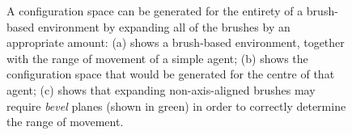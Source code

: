 \documentclass[10pt,twocolumn]{article}
\newenvironment{stusubfig}[1]
{
	\begin{figure}[#1]
	\begin{center}
}
{
	\end{center}
	\end{figure}
}
\begin{document}
\begin{stusubfig}{!t}
	\hspace{4mm}%
	\hspace{4mm}%
\caption{A configuration space can be generated for the entirety of a brush-based environment by expanding all of the brushes by an appropriate amount: (a) shows a brush-based environment, together with the range of movement of a simple agent; (b) shows the configuration space that would be generated for the centre of that agent; (c) shows that expanding non-axis-aligned brushes may require \emph{bevel} planes (shown in green) in order to correctly determine the range of movement.}
\label{fig:configspace}
\end{stusubfig}
\end{document}
